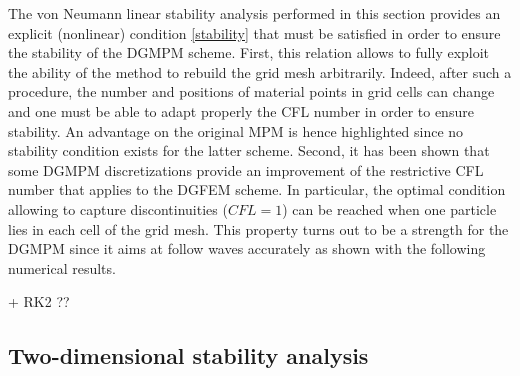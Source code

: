 The von Neumann linear stability analysis performed in this section provides an explicit (nonlinear) condition \eqref{stability} that must be satisfied in order to ensure the stability of the DGMPM scheme. First, this relation allows to fully exploit the ability of the method to rebuild the grid mesh arbitrarily. Indeed, after such a procedure, the number and positions of material points in grid cells can change and one must be able to adapt properly the CFL number in order to ensure stability. An advantage on the original MPM is hence highlighted since no stability condition exists for the latter scheme. Second, it has been shown that some DGMPM discretizations provide an improvement of the restrictive CFL number that applies to the DGFEM scheme. In particular, the optimal condition allowing to capture discontinuities ($CFL=1$) can be reached when one particle lies in each cell of the grid mesh. This property turns out to be a strength for the DGMPM since it aims at follow waves accurately as shown with the following numerical results.


+ RK2 ??
\subsection{Two-dimensional stability analysis}



